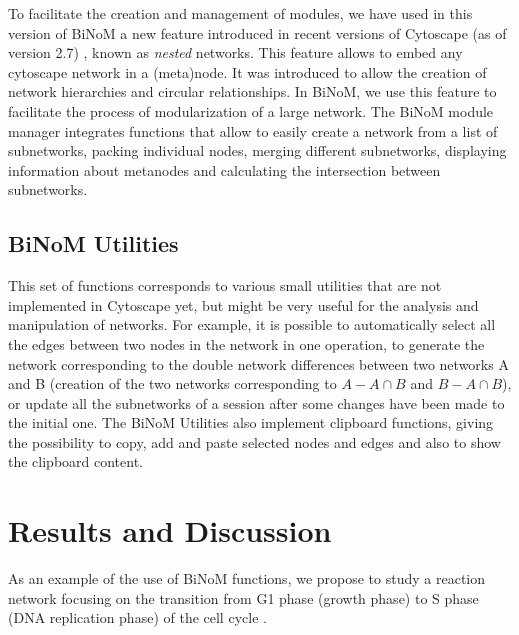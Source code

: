 \documentclass[10pt]{bmc_article}
\newenvironment{bmcformat}{\baselineskip20pt\sloppy\setboolean{publ}{false}}{\baselineskip20pt\sloppy}
\begin{document}
\begin{bmcformat}
To facilitate the creation and management of modules, we have used in this
version of BiNoM a new feature introduced in recent versions of Cytoscape (as of
version 2.7) \cite{cline2007integration}, known as \emph{nested} networks. This
feature allows to embed any cytoscape network in a (meta)node. It was
introduced to allow the creation of network hierarchies and circular
relationships. In BiNoM, we use this feature to facilitate the process of
modularization of a large network. The BiNoM module manager integrates
functions that allow to easily create a network from a list of subnetworks,
packing individual nodes, merging different subnetworks, displaying information
about metanodes and calculating the intersection between subnetworks.

\subsection*{BiNoM Utilities}
This set of functions corresponds to various small utilities that are not
implemented in Cytoscape yet, but might be very useful for the analysis and
manipulation of networks. For example, it is possible to automatically select
all the edges between two nodes in the network in one operation, to generate the
network corresponding to the double
network differences between two networks A and B (creation of the two networks
corresponding to $A - A \cap B$ and $B - A \cap B$), or update all the
subnetworks of
a session after some changes have been made to the initial one. The BiNoM
Utilities also implement
clipboard functions, giving the possibility to copy, add and paste
selected nodes and edges and also to show the clipboard content.


\section*{Results and Discussion}
As an example of the use of BiNoM functions, we propose to study a reaction network focusing on the transition from G1 phase
(growth phase) to S phase (DNA replication phase) of the cell cycle
\cite{calzone2008comprehensive}.


\end{bmcformat}
\end{document}
